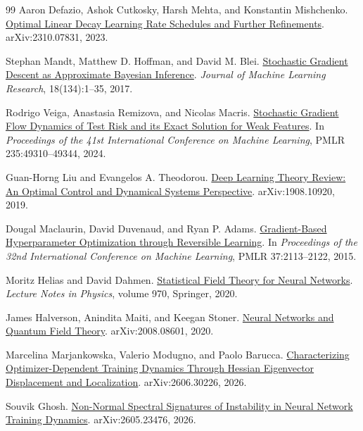 \documentclass[11pt,letterpaper]{article}
\begin{document}
\begin{thebibliography}{99}
Aaron Defazio, Ashok Cutkosky, Harsh Mehta, and Konstantin Mishchenko.
\newblock \href{https://arxiv.org/abs/2310.07831}{Optimal Linear Decay
Learning Rate Schedules and Further Refinements}.
\newblock arXiv:2310.07831, 2023.

Stephan Mandt, Matthew D. Hoffman, and David M. Blei.
\newblock
\href{https://www.jmlr.org/papers/v18/17-214.html}{Stochastic Gradient
Descent as Approximate Bayesian Inference}.
\newblock \emph{Journal of Machine Learning Research}, 18(134):1--35, 2017.

Rodrigo Veiga, Anastasia Remizova, and Nicolas Macris.
\newblock
\href{https://proceedings.mlr.press/v235/veiga24a.html}{Stochastic Gradient
Flow Dynamics of Test Risk and its Exact Solution for Weak Features}.
\newblock In \emph{Proceedings of the 41st International Conference on
Machine Learning}, PMLR 235:49310--49344, 2024.

Guan-Horng Liu and Evangelos A. Theodorou.
\newblock
\href{https://arxiv.org/abs/1908.10920}{Deep Learning Theory Review: An
Optimal Control and Dynamical Systems Perspective}.
\newblock arXiv:1908.10920, 2019.

Dougal Maclaurin, David Duvenaud, and Ryan P. Adams.
\newblock
\href{https://proceedings.mlr.press/v37/maclaurin15.html}{Gradient-Based
Hyperparameter Optimization through Reversible Learning}.
\newblock In \emph{Proceedings of the 32nd International Conference on
Machine Learning}, PMLR 37:2113--2122, 2015.

Moritz Helias and David Dahmen.
\newblock
\href{https://arxiv.org/abs/1901.10416}{Statistical Field Theory for Neural
Networks}.
\newblock \emph{Lecture Notes in Physics}, volume 970, Springer, 2020.

James Halverson, Anindita Maiti, and Keegan Stoner.
\newblock
\href{https://arxiv.org/abs/2008.08601}{Neural Networks and Quantum Field
Theory}.
\newblock arXiv:2008.08601, 2020.

Marcelina Marjankowska, Valerio Modugno, and Paolo Barucca.
\newblock
\href{https://arxiv.org/abs/2606.30226}{Characterizing Optimizer-Dependent
Training Dynamics Through Hessian Eigenvector Displacement and Localization}.
\newblock arXiv:2606.30226, 2026.

Souvik Ghosh.
\newblock
\href{https://arxiv.org/abs/2605.23476}{Non-Normal Spectral Signatures of
Instability in Neural Network Training Dynamics}.
\newblock arXiv:2605.23476, 2026.


\end{thebibliography}
\end{document}
